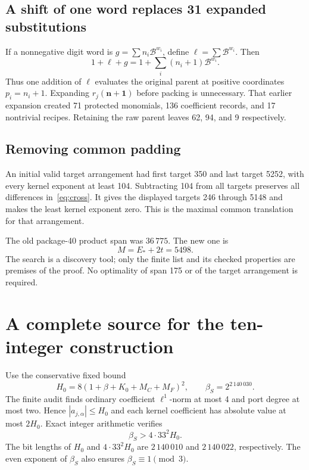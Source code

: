 \documentclass[11pt,letterpaper]{article}
\theoremstyle{definition}\newtheorem{definition}[theorem]{Definition}
\newcommand{\BB}{\mathcal B}\newcommand{\Dc}{\mathcal D}\newcommand{\Ccap}{\mathcal C}
\begin{document}
\subsection{A shift of one word replaces 31 expanded substitutions}
If a nonnegative digit word is $g=\sum n_i\BB^{w_i}$, define
$\ell=\sum\BB^{w_i}$. Then
\begin{equation}
1+\ell+g=1+\sum_i(n_i+1)\BB^{w_i}.
\label{eq:wordshift}
\end{equation}
Thus one addition of $\ell$ evaluates the original parent at positive
coordinates $p_i=n_i+1$. Expanding $r_j(\mathbf n+\mathbf1)$ before
packing is unnecessary. That earlier expansion created 71 protected
monomials, 136 coefficient records, and 17 nontrivial recipes. Retaining
the raw parent leaves 62, 94, and 9 respectively.

\subsection{Removing common padding}
An initial valid target arrangement had first target 350 and last target
5252, with every kernel exponent at least 104. Subtracting 104 from all
targets preserves all differences in~\eqref{eq:cross}. It gives the
displayed targets 246 through 5148 and makes the least kernel exponent
zero. This is the maximal common translation for that arrangement.

The old package-40 product span was $36\,775$. The new one is
\begin{equation}
M=E_*+2t=5498.
\label{eq:span}
\end{equation}
The search is a discovery tool; only the finite list and its checked
properties are premises of the proof. No optimality of span 175 or of
the target arrangement is required.

\section{A complete source for the ten-integer construction}
\label{sec:source}

Use the conservative fixed bound
\[
H_0=8(1+\beta+K_0+M_C+M_F)^2,
\qquad \beta_S=2^{2\,140\,030}.
\]
The finite audit finds ordinary coefficient $\ell^1$-norm at most 4 and
port degree at most two. Hence $|a_{j,\alpha}|\le H_0$ and each kernel
coefficient has absolute value at most $2H_0$. Exact integer arithmetic
verifies
\begin{equation}
\beta_S>4\cdot33^2H_0.\label{eq:betabound}
\end{equation}
The bit lengths of $H_0$ and $4\cdot33^2H_0$ are $2\,140\,010$ and
$2\,140\,022$, respectively. The even exponent of $\beta_S$ also ensures
$\beta_S\equiv1\pmod3$.
\end{document}
